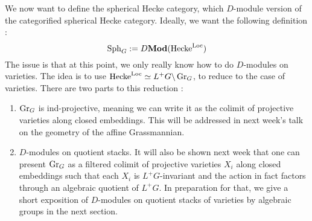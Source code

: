 \documentclass{article}
\begin{document}
We now want to define the spherical Hecke category,
which $D$-module version of the categorified spherical Hecke category.
Ideally, we want the following definition : 
\[
  \operatorname{Sph}_G := D\mathbf{Mod}(\mathrm{Hecke}^{\mathrm{Loc}})
\]
The issue is that at this point, we only really know how to do
$D$-modules on varieties.
The idea is to use $\mathrm{Hecke}^{\mathrm{Loc}} \simeq L^+G \backslash \operatorname{Gr}_G$,
to reduce to the case of varieties.
There are two parts to this reduction : 
\begin{enumerate}
  \item $\operatorname{Gr}_G$ is ind-projective,
  meaning we can write it as the colimit of projective varieties
  along closed embeddings.
  This will be addressed in next week's talk 
  on the geometry of the affine Grassmannian.
  \item $D$-modules on quotient stacks.
  It will also be shown next week that
  one can present $\operatorname{Gr}_G$ as a filtered colimit of
  projective varieties $X_i$ along closed embeddings
  such that each $X_i$ is $L^+G$-invariant and
  the action in fact factors through an algebraic quotient of $L^+G$.
  In preparation for that,
  we give a short exposition of $D$-modules on
  quotient stacks of varieties by algebraic groups in the next section.
\end{enumerate}
\end{document}
